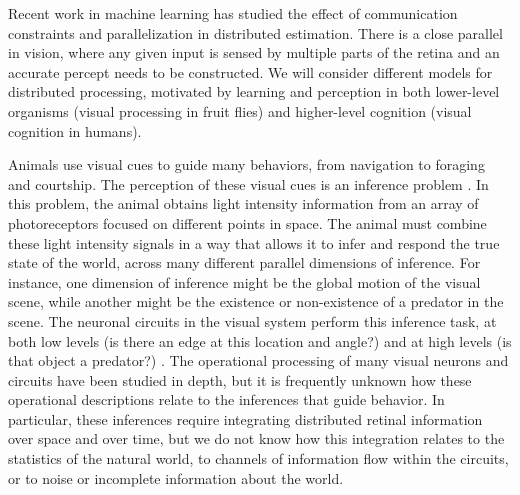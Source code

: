 
\label{sec:aim1}

Recent work in machine learning has studied the effect of
communication constraints and parallelization in distributed
estimation. There is a close parallel in vision, where any given input
is sensed by multiple parts of the retina and an accurate percept
needs to be constructed. We will consider different models
for distributed processing, motivated by learning and perception in
both lower-level organisms (visual processing in fruit flies) and
higher-level cognition (visual cognition in humans). 


\biobackground{}
Animals use visual cues to guide many behaviors, from navigation to
foraging and courtship. The perception of these visual cues is an
inference problem \citep{knill:96}. In this problem, the
animal obtains light intensity information from an array of
photoreceptors focused on different points in space. The animal must
combine these light intensity signals in a way that allows it to infer
and respond the true state of the world, across many different
parallel dimensions of inference. For instance, one dimension of
inference might be the global motion of the visual scene, while
another might be the existence or non-existence of a predator in the
scene. The neuronal circuits in the visual system perform this
inference task, at both low levels (is there an edge at this location
and angle?) and at high levels (is that object a predator?)
\citep{simoncelli:01}. The operational processing of many
visual neurons and circuits have been studied in depth, but it is
frequently unknown how these operational descriptions relate to the
inferences that guide behavior. In particular, these inferences
require integrating distributed retinal information over space and
over time, but we do not know how this integration relates to the
statistics of the natural world, to channels of information flow
within the circuits, or to noise or incomplete information about the
world.

